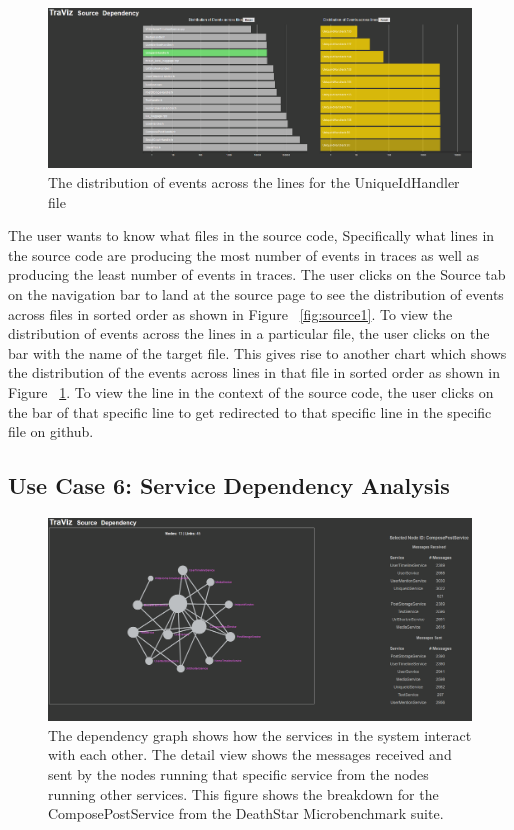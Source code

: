 \begin{figure}
    \centering
        \includegraphics[width=\textwidth]{fig/sourcecode2}
        \caption{The distribution of events across the lines for the UniqueIdHandler file}
        \label{fig:source2}
\end{figure}

The user wants to know what files in the source code, Specifically
what lines in the source code are producing the most number of events
in traces as well as producing the least number of events in traces.
The user clicks on the Source tab on the navigation bar
to land at the source page to see the distribution of events
across files in sorted order as shown in Figure ~\ref{fig:source1}.
To view the distribution of events across the lines in a particular
file, the user clicks on the bar with the name of the target file.
This gives rise to another chart which shows the distribution
of the events across lines in that file in sorted order as shown
in Figure ~\ref{fig:source2}. To view the line in the context of the source
code, the user clicks on the bar of that specific line to get
redirected to that specific line in the specific file on github.

\subsection{Use Case 6: Service Dependency Analysis}

\begin{figure}
    \centering
    \includegraphics[width=\textwidth]{fig/dependency}
    \caption{The dependency graph shows how the services in the system interact with each other. 
    The detail view shows the messages received and sent by the nodes running that specific service from
    the nodes running other services. This figure shows the breakdown for the ComposePostService from the DeathStar
    Microbenchmark suite.}
    \label{fig:dependency}
\end{figure}

